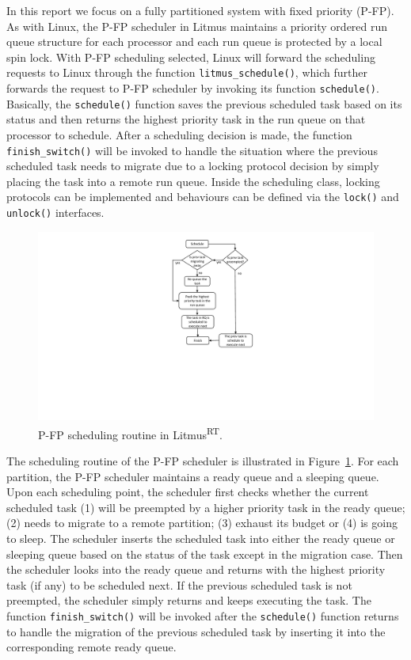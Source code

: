 \documentclass{report}
\begin{document}
In this report we focus on a fully partitioned system with fixed priority (P-FP). As with Linux, the P-FP scheduler in Litmus maintains a priority ordered run queue structure for each processor and each run queue is protected by a local spin lock. With P-FP scheduling selected, Linux will forward the scheduling requests to Linux through the function \texttt{litmus\_schedule()}, which further forwards the request to P-FP scheduler by invoking its function \texttt{schedule()}. Basically, the \texttt{schedule()} function saves the previous scheduled task based on its status and then returns the highest priority task in the run queue on that processor to schedule. After a scheduling decision is made, the function \texttt{finish\_switch()} will be invoked to handle the situation where the previous scheduled task needs to migrate due to a locking protocol decision by simply placing the task into a remote run queue. Inside the scheduling class, locking protocols can be implemented and behaviours can be defined via the  \texttt{lock()} and \texttt{unlock()} interfaces.

\begin{figure}[h]
\centering
\includegraphics[width=.6\columnwidth]{graphics/pfp1.pdf}
\caption{P-FP scheduling routine in Litmus\textsuperscript{RT}.}
\label{pfp}
\end{figure}

The scheduling routine of the P-FP scheduler is illustrated in Figure~\ref{pfp}. For each partition, the P-FP scheduler maintains a ready queue and a sleeping queue. Upon each scheduling point, the scheduler first checks whether the current scheduled task (1) will be preempted by a higher priority task in the ready queue; (2) needs to migrate to a remote partition; (3) exhaust its budget or (4) is going to sleep. The scheduler inserts the scheduled task into either the ready queue or sleeping queue based on the status of the task except in the migration case. Then the scheduler looks into the ready queue and returns with the highest priority task (if any) to be scheduled next. If the previous scheduled task is not preempted, the scheduler simply returns and keeps executing the task. The function \texttt{finish\_switch()} will be invoked after the \texttt{schedule()} function returns to handle the migration of the previous scheduled task by inserting it into the corresponding remote ready queue.
\end{document}
